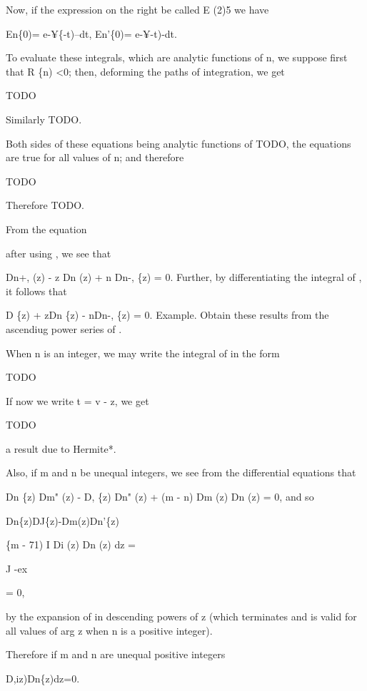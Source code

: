 Now, if the expression on the right be called E (2)5 we have

En\{0)= e-¥\{-t)--dt, En'\{0)= e-¥-t)-dt.

To evaluate these integrals, which are analytic functions of n, we
suppose first that R \{n) <0; then, deforming the paths of
integration, we get

TODO

Similarly TODO.

Both sides of these equations being analytic functions of TODO, the
equations are true for all values of n; and therefore

TODO

Therefore TODO.

%
%

From the equation

after using , we see that

Dn+, (z) - z Dn (z) + n Dn-, \{z) = 0. Further, by differentiating the
integral of , it follows that

D \{z) + zDn \{z) - nDn-, \{z) = 0. Example. Obtain these results
from the ascendiug power series of .


When n is an integer, we may write the integral of  in the form

TODO

If now we write t = v - z, we get

TODO

a result due to Hermite*.

Also, if m and n be unequal integers, we see from the differential
equations that

Dn \{z) Dm" (z) - D, \{z) Dn" (z) + (m - n) Dm (z) Dn (z) = 0, and so

Dn\{z)DJ\{z)-Dm(z)Dn'\{z)

\{m - 71) I Di (z) Dn (z) dz =

J -ex

= 0,

by the expansion of  in descending powers of z (which terminates
and is valid for all values of arg z when n is a positive integer).

Therefore if m and n are unequal positive integers

D,iz)Dn\{z)dz=0.

